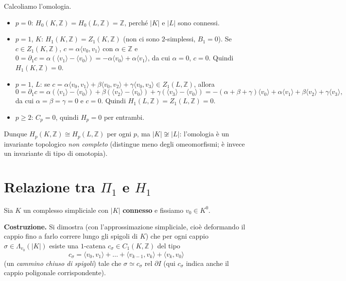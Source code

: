 \begin{ejemplo}[Controesempio]
Calcoliamo l'omologia.
\begin{itemize}
    \item $p = 0$: $H_0(K, \mathbb{Z}) = H_0(L, \mathbb{Z}) = \mathbb{Z}$, perch\'e $|K|$ e $|L|$ sono connessi.
    \item $p = 1$, $K$: $H_1(K, \mathbb{Z}) = Z_1(K, \mathbb{Z})$ (non ci sono $2$-simplessi, $B_1 = 0$). Se $c \in Z_1(K, \mathbb{Z})$, $c = \alpha \langle v_0, v_1 \rangle$ con $\alpha \in \mathbb{Z}$ e $0 = \partial_1 c = \alpha(\langle v_1 \rangle - \langle v_0 \rangle) = -\alpha \langle v_0 \rangle + \alpha \langle v_1 \rangle$, da cui $\alpha = 0$, $c = 0$. Quindi $H_1(K, \mathbb{Z}) = 0$.
    \item $p = 1$, $L$: se $c = \alpha \langle v_0, v_1 \rangle + \beta \langle v_0, v_2 \rangle + \gamma \langle v_0, v_3 \rangle \in Z_1(L, \mathbb{Z})$, allora
    \[
    0 = \partial_1 c = \alpha(\langle v_1 \rangle - \langle v_0 \rangle) + \beta(\langle v_2 \rangle - \langle v_0 \rangle) + \gamma(\langle v_3 \rangle - \langle v_0 \rangle) = -(\alpha + \beta + \gamma)\langle v_0 \rangle + \alpha \langle v_1 \rangle + \beta \langle v_2 \rangle + \gamma \langle v_3 \rangle,
    \]
    da cui $\alpha = \beta = \gamma = 0$ e $c = 0$. Quindi $H_1(L, \mathbb{Z}) = Z_1(L, \mathbb{Z}) = 0$.
    \item $p \geqslant 2$: $C_p = 0$, quindi $H_p = 0$ per entrambi.
\end{itemize}
Dunque $H_p(K, \mathbb{Z}) \cong H_p(L, \mathbb{Z})$ per ogni $p$, ma $|K| \not\cong |L|$: l'omologia \`e un invariante topologico \emph{non completo} (distingue meno degli omeomorfismi; \`e invece un invariante di tipo di omotopia).
\end{ejemplo}


\section{Relazione tra $\Pi_1$ e $H_1$}

Sia $K$ un complesso simpliciale con $|K|$ \textbf{connesso} e fissiamo $v_0 \in K^0$.

\medskip
\textbf{Costruzione.} Si dimostra (con l'approssimazione simpliciale, cio\`e deformando il cappio fino a farlo correre lungo gli spigoli di $K$) che per ogni cappio $\sigma \in \Lambda_{v_0}(|K|)$ esiste una $1$-catena $c_\sigma \in C_1(K, \mathbb{Z})$ del tipo
\[
c_\sigma = \langle v_0, v_1 \rangle + \dots + \langle v_{k-1}, v_k \rangle + \langle v_k, v_0 \rangle
\]
(un \emph{cammino chiuso di spigoli}) tale che $\sigma \simeq c_\sigma$ rel $\partial I$ (qui $c_\sigma$ indica anche il cappio poligonale corrispondente).

